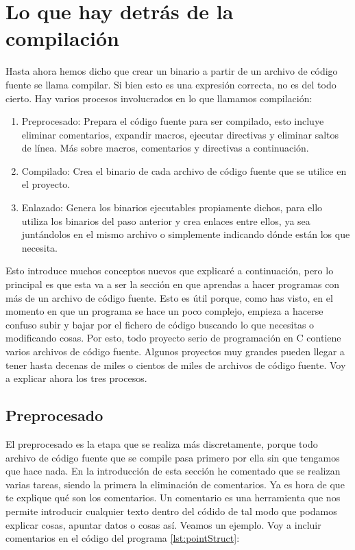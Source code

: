 \documentclass[a4paper]{article}
\begin{document}
\section{Lo que hay detrás de la compilación}
Hasta ahora hemos dicho que crear un binario a partir de un archivo de código
fuente se llama compilar. Si bien esto es una expresión correcta, no es del todo
cierto. Hay varios procesos involucrados en lo que llamamos compilación:
\begin{enumerate}
\item Preprocesado: Prepara el código fuente para ser compilado, esto incluye
eliminar comentarios, expandir macros, ejecutar directivas y eliminar saltos de
línea. Más sobre macros, comentarios y directivas a continuación.
\item Compilado: Crea el binario de cada archivo de código fuente que se utilice
en el proyecto.
\item Enlazado: Genera los binarios ejecutables propiamente dichos, para ello
utiliza los binarios del paso anterior y crea enlaces entre ellos, ya sea
juntándolos en el mismo archivo o simplemente indicando dónde están los que
necesita.
\end{enumerate}

Esto introduce muchos conceptos nuevos que explicaré a continuación, pero lo
principal es que esta va a ser la sección en que aprendas a hacer programas con
más de un archivo de código fuente. Esto es útil porque, como has visto, en el
momento en que un programa se hace un poco complejo, empieza a hacerse confuso
subir y bajar por el fichero de código buscando lo que necesitas o modificando
cosas. Por esto, todo proyecto serio de programación en C contiene varios
archivos de código fuente. Algunos proyectos muy grandes pueden llegar a tener
hasta decenas de miles o cientos de miles de archivos de código fuente.
Voy a explicar ahora los tres procesos.

\subsection{Preprocesado}
El preprocesado es la etapa que se realiza más discretamente, porque todo
archivo de código fuente que se compile pasa primero por ella sin que tengamos
que hace nada. En la introducción de esta sección he comentado que se realizan
varias tareas, siendo la primera la eliminación de comentarios. Ya es hora de
que te explique qué son los comentarios. Un comentario es una herramienta que
nos permite introducir cualquier texto dentro del códido de tal modo que podamos
explicar cosas, apuntar datos o cosas así. Veamos un ejemplo. Voy a incluir
comentarios en el código del
programa \ref {lst:pointStruct}: 
\end{document}
